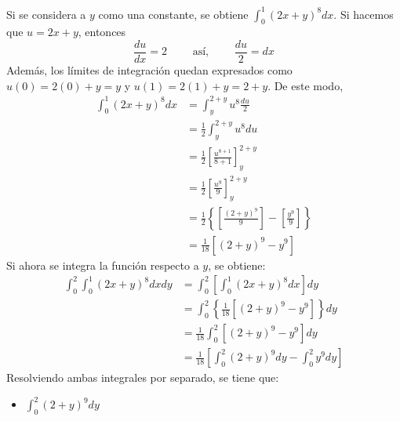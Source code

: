 \documentclass[12pt]{exam}
\begin{document}
\begin{questions}
\begin{enumerate}[a)]
    Si se considera a $y$ como una constante, se obtiene $ \int_{0}^{1} (2x+y)^8 dx $. Si hacemos que $u = 2x+y$, entonces
    $$ \frac{du}{dx}=2 \qquad \text{ así, } \qquad \frac{du}{2}=dx $$
    Además, los límites de integración quedan expresados como $u(0)=2(0)+y=y$ y $u(1)=2(1)+y=2+y$. De este modo,
    \begin{align*}
      \int_{0}^{1} (2x+y)^8 dx 
      &= \int_{y}^{2+y} u^8 \frac{du}{2}  \\
      &= \frac{1}{2} \int_{y}^{2+y} u^8 du \\
      &= \frac{1}{2} \left[ \frac{u^{8+1}}{8+1}\right]_y^{2+y} \\
      &= \frac{1}{2} \left[ \frac{u^9}{9}\right]_y^{2+y}  \\
      &= \frac{1}{2} \left\{ \left[ \frac{(2+y)^9}{9}\right] - \left[ \frac{y^9}{9}\right] \right\} \\
      &= \frac{1}{18} \left[ (2+y)^9 - y^9 \right] 
    \end{align*}
    Si ahora se integra la función respecto a $y$, se obtiene:
    \begin{align*}
      \int_{0}^{2}\int_{0}^{1} (2x+y)^8 dx dy
      &= \int_{0}^{2} \left[\int_{0}^{1} (2x+y)^8 dx \right] dy \\
      &= \int_{0}^{2} \left\{ \frac{1}{18} \left[ (2+y)^9 - y^9 \right] \right\} dy \\
      &= \frac{1}{18} \int_{0}^{2} \left[ (2+y)^9 - y^9 \right] dy \\
      &= \frac{1}{18} \left[ \int_0^2(2+y)^9dy - \int_0^2y^9dy \right]
    \end{align*}
    Resolviendo ambas integrales por separado, se tiene que:
    
    \begin{multicols}{2}
      \begin{itemize}[format=\textbf]
      \item $\int_0^2(2+y)^9dy$
        

\end{itemize}
\end{multicols}
\end{enumerate}
\end{questions}
\end{document}
